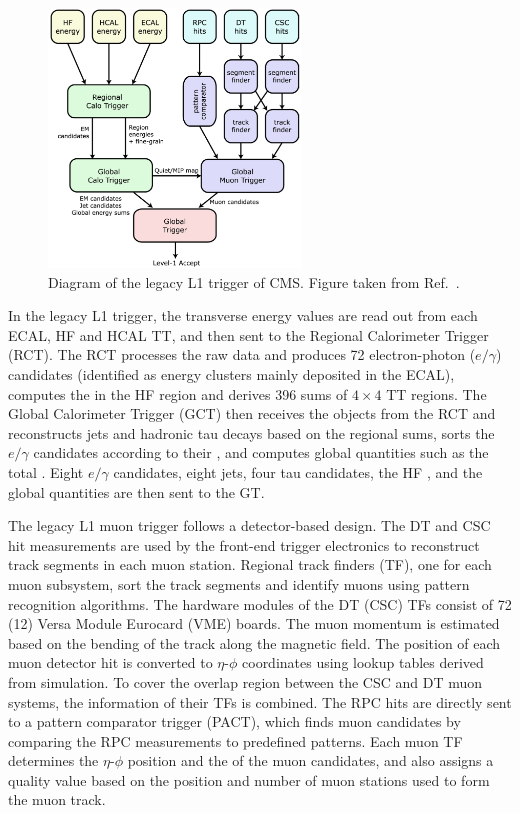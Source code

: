 \begin{figure}[!htbp]
 \centering
 \includegraphics[width=0.6\textwidth]{Figures/Experiment/CMS/L1Trigger_Legacy.png}
 \caption{Diagram of the legacy L1 trigger of CMS. Figure taken from Ref.~\cite{L1TriggerLegacyFig}.}
 \label{fig:L1TriggerLegacy}
\end{figure}

In the legacy L1 trigger, the transverse energy \Et values are read out from each ECAL, HF and HCAL TT, and then sent to the Regional Calorimeter Trigger (RCT). The RCT processes the raw data and produces 72 electron-photon ($e/\gamma$) candidates (identified as energy clusters mainly deposited in the ECAL), computes the \Et in the HF region and derives 396 \Et sums of $4\times{4}$ TT regions. The Global Calorimeter Trigger (GCT) then receives the objects from the RCT and reconstructs jets and hadronic tau decays based on the regional \Et sums, sorts the $e/\gamma$ candidates according to their \Et, and computes global quantities such as the total \Et. Eight $e/\gamma$ candidates, eight jets, four tau candidates, the HF \Et, and the global quantities are then sent to the GT.

The legacy L1 muon trigger follows a detector-based design. The DT and CSC hit measurements are used by the front-end trigger electronics to reconstruct track segments in each muon station. Regional track finders (TF), one for each muon subsystem, sort the track segments and identify muons using pattern recognition algorithms. The hardware modules of the DT (CSC) TFs consist of 72 (12) Versa Module
Eurocard (VME) boards. The muon momentum is estimated based on the bending of the track along the magnetic field. The position of each muon detector hit is converted to $\eta$-$\phi$ coordinates using lookup tables derived from simulation. To cover the overlap region between the CSC and DT muon systems, the information of their TFs is combined. The RPC hits are directly sent to a pattern comparator trigger (PACT), which finds muon candidates by comparing the RPC measurements to predefined patterns. Each muon TF determines the $\eta$-$\phi$ position and the \pt of the muon candidates, and also assigns a quality value based on the position and number of muon stations used to form the muon track.

